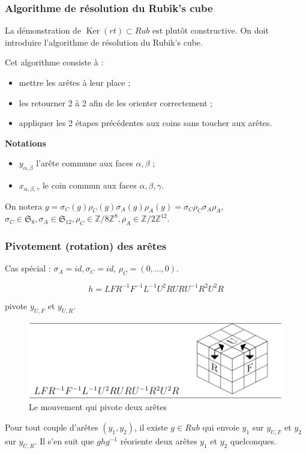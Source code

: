 \documentclass[10pt,notheorems]{beamer}
\theoremstyle{plain}
\theoremstyle{definition}
\theoremstyle{plain}
\theoremstyle{plain}
\theoremstyle{plain}
\theoremstyle{remark}
\begin{document}
\begin{frame}
  \frametitle{Algorithme de résolution du Rubik's cube}
  La démonstration de $\operatorname{Ker}(rt) \subset Rub$ est plutôt constructive. On doit introduire l'algorithme de résolution du Rubik's cube.

  Cet algorithme consiste à :

  \begin{itemize}
    \item mettre les arêtes à leur place ;
    \item les retourner 2 à 2 afin de les orienter correctement ;
    \item appliquer les 2 étapes précédentes aux coins sans toucher aux arêtes.
  \end{itemize}


\textbf{Notations}
\begin{itemize}
  \item $y _{\alpha, \beta }$ l'arête commune aux faces $\alpha, \beta $ ;
  \item $x _{\alpha, \beta, \gamma }$ le coin commun aux faces $\alpha, \beta , \gamma $.
\end{itemize}

On notera $g = \sigma_C(g) \rho_C(g) \sigma_A(g) \rho_A(g) = \sigma_C \rho_C \sigma_A \rho_A$, $\sigma_C \in \mathfrak{S}_{8}, \sigma_A \in \mathfrak{S}_{12}, \rho_C \in \mathbb{Z}/{ 8 }\mathbb{Z} ^{8}, \rho_A \in \mathbb{Z}/{ 2 }\mathbb{Z} ^{12}$.

\end{frame}

\begin{frame}
  \frametitle{Pivotement (rotation) des arêtes}
Cas spécial :  $\sigma_A =id , \sigma_C = id$, $\rho_C = (0, \dots, 0)$.

  $$ h= LF R ^{-1}  F ^{-1}  L ^{-1}  U ^2 RU RU ^{-1}  R ^2 U ^2 R  $$

  pivote $y _{U,F}$ et $y _{U,R}$.
  \begin{figure}[h!]
    \centering
    \includegraphics[scale=0.2]{figures/pivote_2_aretes.png}
    \caption{Le mouvement qui pivote deux arêtes}
    \label{pivote_2_aretes}
  \end{figure}


Pour tout couple d'arêtes $(y_1, y_2)$, il existe $g \in Rub$ qui envoie $y_1 $ sur $ y _{U,F}$ et $y_2$ sur $y _{U,R}$. Il s'en suit que $g h g ^{-1} $ réoriente deux arêtes $y_1$ et $y_2$ quelconques.

\end{frame}
\end{document}
